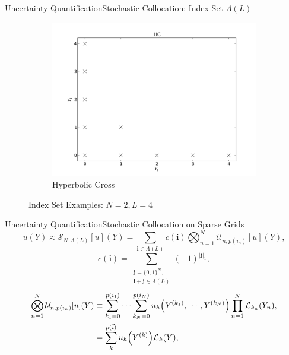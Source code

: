 \documentclass{beamer}
\begin{document}
\begin{frame}{Uncertainty Quantification}{Stochastic Collocation: Index Set $\Lambda(L)$}
\begin{figure}[H]
\begin{subfigure}[b]{0.32 \textwidth}
   \includegraphics[width=\textwidth]{../graphics/HC}
   \caption{Hyperbolic Cross}
   \label{HC}
  \end{subfigure}
  \caption{Index Set Examples: $N=2,L=4$}
  \label{indexsets}
\end{figure}
\end{frame}

\begin{frame}{Uncertainty Quantification}{Stochastic Collocation on Sparse Grids}\normalsize\vspace{-20pt}
\begin{equation*}
u(Y)\approx\mathcal{S}_{N,\Lambda(L)}[u](Y)=\sum_{\boldsymbol{i}\in\Lambda(L)}c(\boldsymbol{i})\bigotimes_{n=1}^N\mathcal{U}_{n,p(i_n)}[u](Y),
\end{equation*}
\begin{equation*}
c(\boldsymbol{i})=\sum_{\substack{\boldsymbol{j}=\{0,1\}^N,\\ \boldsymbol{i}+\boldsymbol{j}\in\Lambda(L)}}(-1)^{|\boldsymbol{j}|_1},
\end{equation*}
\begin{align*}
\bigotimes_{n=1}^N\mathcal{U}_{n,p(i_n)}[u](Y)&\equiv\sum_{k_1=0}^{p(i_1)}\cdots\sum_{k_N=0}^{p(i_N)}u_h\qty(Y^{(k_1)},\cdots,Y^{(k_N)})\prod_{n=1}^N \mathcal{L}_{k_n}(Y_n),\\
  &=\sum_{k}^{p(\vec i)}u_h\qty(Y^{(k)})\mathcal{L}_k(Y),
\end{align*}
\end{frame}
\end{document}
